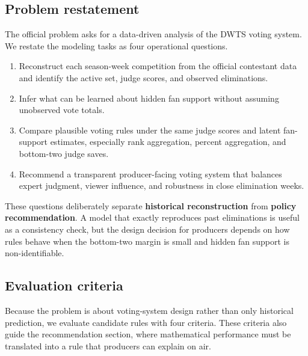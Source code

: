 \documentclass[12pt]{article}
\begin{document}
\subsection{Problem restatement}

The official problem asks for a data-driven analysis of the DWTS voting
system. We restate the modeling tasks as four operational questions.

\begin{enumerate}
  \item Reconstruct each season-week competition from the official contestant
  data and identify the active set, judge scores, and observed eliminations.
  \item Infer what can be learned about hidden fan support without assuming
  unobserved vote totals.
  \item Compare plausible voting rules under the same judge scores and latent
  fan-support estimates, especially rank aggregation, percent aggregation, and
  bottom-two judge saves.
  \item Recommend a transparent producer-facing voting system that balances
  expert judgment, viewer influence, and robustness in close elimination weeks.
\end{enumerate}

These questions deliberately separate \textbf{historical reconstruction} from
\textbf{policy recommendation}. A model that exactly reproduces past eliminations is useful as
a consistency check, but the design decision for producers depends on how rules
behave when the bottom-two margin is small and hidden fan support is
non-identifiable.

\subsection{Evaluation criteria}

Because the problem is about voting-system design rather than only historical
prediction, we evaluate candidate rules with four criteria. These criteria
also guide the recommendation section, where mathematical performance must be
translated into a rule that producers can explain on air.
\end{document}
